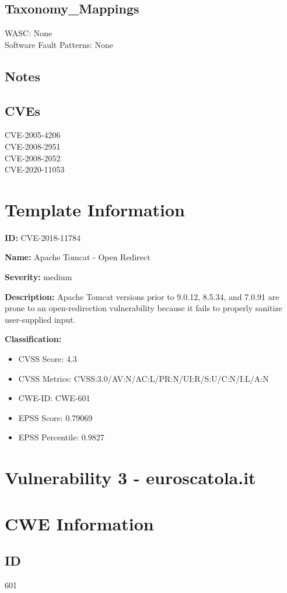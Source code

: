 \subsection*{Taxonomy\_Mappings}
WASC: None\\
Software Fault Patterns: None\\
\subsection*{Notes}
\subsection*{CVEs}
CVE-2005-4206\\
CVE-2008-2951\\
CVE-2008-2052\\
CVE-2020-11053\\
\section*{Template Information}
\textbf{ID:} CVE-2018-11784

\textbf{Name:} Apache Tomcat - Open Redirect

\textbf{Severity:} medium

\textbf{Description:} Apache Tomcat versions prior to 9.0.12, 8.5.34, and 7.0.91 are prone to an open-redirection vulnerability because it fails to properly sanitize user-supplied input.


\textbf{Classification:}
\begin{itemize}
\item CVSS Score: 4.3
\item CVSS Metrics: CVSS:3.0/AV:N/AC:L/PR:N/UI:R/S:U/C:N/I:L/A:N
\item CWE-ID: CWE-601
\item EPSS Score: 0.79069
\item EPSS Percentile: 0.9827
\end{itemize}



\section*{Vulnerability 3 - euroscatola.it}

\section*{CWE Information}
\subsection*{ID}
601

